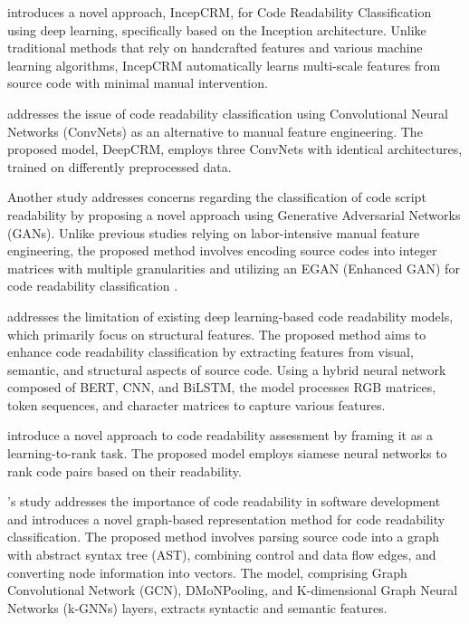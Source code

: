 \documentclass[%
class=scrreprt,
chapterprefix=false,%
open=right,%
twoside=false,%
paper=a4,%
logofile={Logo\_zentral\_farbig\_EN.png},%
thesistype=master,%
UKenglish,%
]{se2thesis}
\begin{document}
	\citeauthor{mi2018inception} introduces a novel approach, IncepCRM, for Code Readability Classification using deep learning, specifically based on the Inception architecture. Unlike traditional methods that rely on handcrafted features and various machine learning algorithms, IncepCRM automatically learns multi-scale features from source code with minimal manual intervention.
	
	\cite{mi2018improving} addresses the issue of code readability classification using Convolutional Neural Networks (ConvNets) as an alternative to manual feature engineering. The proposed model, DeepCRM, employs three ConvNets with identical architectures, trained on differently preprocessed data.
		
	Another study addresses concerns regarding the classification of code script readability by proposing a novel approach using Generative Adversarial Networks (GANs). Unlike previous studies relying on labor-intensive manual feature engineering, the proposed method involves encoding source codes into integer matrices with multiple granularities and utilizing an EGAN (Enhanced GAN) for code readability classification \cite{sharma2020egan}.
	
	\citeauthor{mi2022towards} addresses the limitation of existing deep learning-based code readability models, which primarily focus on structural features. The proposed method aims to enhance code readability classification by extracting features from visual, semantic, and structural aspects of source code. Using a hybrid neural network composed of BERT, CNN, and BiLSTM, the model processes RGB matrices, token sequences, and character matrices to capture various features.
	
	\citeauthor{mi2022rank} introduce a novel approach to code readability assessment by framing it as a learning-to-rank task. The proposed model employs siamese neural networks to rank code pairs based on their readability.

	\citeauthor{mi2023graph}'s study addresses the importance of code readability in software development and introduces a novel graph-based representation method for code readability classification. The proposed method involves parsing source code into a graph with abstract syntax tree (AST), combining control and data flow edges, and converting node information into vectors. The model, comprising Graph Convolutional Network (GCN), DMoNPooling, and K-dimensional Graph Neural Networks (k-GNNs) layers, extracts syntactic and semantic features.
	
\end{document}
